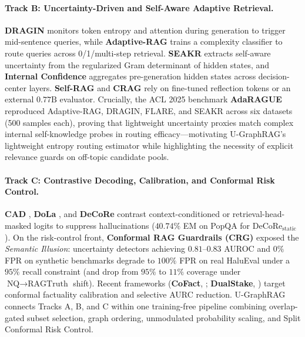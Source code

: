 \documentclass[11pt]{article}
\begin{document}
\paragraph{Track B: Uncertainty-Driven and Self-Aware Adaptive Retrieval.}
\textbf{DRAGIN} \cite{su2024dragin} monitors token entropy and attention during generation to trigger mid-sentence queries, while \textbf{Adaptive-RAG} \cite{jeong2024adaptiverag} trains a complexity classifier to route queries across 0/1/multi-step retrieval. \textbf{SEAKR} \cite{yao2025seakr} extracts self-aware uncertainty from the regularized Gram determinant of hidden states, and \textbf{Internal Confidence} \cite{chen2026internalconfidence} aggregates pre-generation hidden states across decision-center layers. \textbf{Self-RAG} \cite{asai2024selfrag} and \textbf{CRAG} \cite{yan2024crag} rely on fine-tuned reflection tokens or an external $0.77\text{B}$ evaluator. Crucially, the ACL 2025 benchmark \textbf{AdaRAGUE} \cite{adarague2025} reproduced Adaptive-RAG, DRAGIN, FLARE, and SEAKR across six datasets (500 samples each), proving that lightweight uncertainty proxies match complex internal self-knowledge probes in routing efficacy---motivating U-GraphRAG's lightweight entropy routing estimator while highlighting the necessity of explicit relevance guards on off-topic candidate pools.

\paragraph{Track C: Contrastive Decoding, Calibration, and Conformal Risk Control.}
\textbf{CAD} \cite{shi2024cad}, \textbf{DoLa} \cite{chuang2024dola}, and \textbf{DeCoRe} \cite{gema2025decore} contrast context-conditioned or retrieval-head-masked logits to suppress hallucinations ($40.74\%$ EM on PopQA for $\text{DeCoRe}_{\text{static}}$). On the risk-control front, \textbf{Conformal RAG Guardrails (CRG)} \cite{sinha2025crg} exposed the \emph{Semantic Illusion}: uncertainty detectors achieving $0.81\text{--}0.83$ AUROC and $0\%$ FPR on synthetic benchmarks degrade to $100\%$ FPR on real HaluEval under a $95\%$ recall constraint (and drop from $95\%$ to $11\%$ coverage under $\text{NQ}\to\text{RAGTruth}$ shift). Recent frameworks (\textbf{CoFact}, \citealp{cofact2026}; \textbf{DualStake}, \citealp{dualstake2026}) target conformal factuality calibration and selective AURC reduction. U-GraphRAG connects Tracks A, B, and C within one training-free pipeline combining overlap-gated subset selection, graph ordering, unmodulated probability scaling, and Split Conformal Risk Control.
\end{document}
